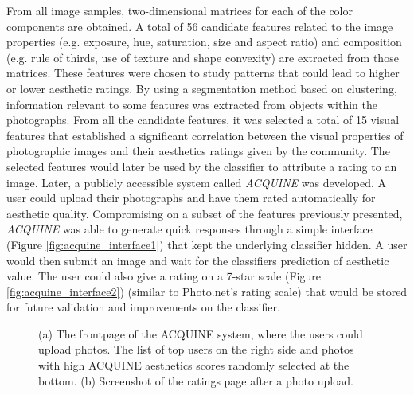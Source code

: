 From all image samples, two-dimensional matrices for each of the color components are obtained. A total of 56 candidate features related to the image properties (e.g. exposure, hue, saturation, size and aspect ratio) and composition (e.g. rule of thirds, use of texture and shape convexity) are extracted from those matrices. 
These features were chosen to study patterns that could lead to higher or lower aesthetic ratings. By using a segmentation method based on clustering, information relevant to some features was extracted from objects within the photographs.
From all the candidate features, it was selected a total of 15 visual features that established a significant correlation between the visual properties of photographic images and their aesthetics ratings given by the community. The selected features would later be used by the classifier to attribute a rating to an image.
Later, a publicly accessible system called \emph{ACQUINE} \cite{datta2010acquine} was developed. A user could upload their photographs and have them rated automatically for aesthetic quality. Compromising on a subset of the features previously presented, \emph{ACQUINE} was able to generate quick responses through a simple interface (Figure \ref{fig:acquine_interface1}) that kept the underlying classifier hidden. A user would then submit an image and wait for the classifiers prediction of aesthetic value. The user could also give a rating on a 7-star scale (Figure \ref{fig:acquine_interface2}) (similar to Photo.net's rating scale) that would be stored for future validation and improvements on the classifier.

\begin{figure}[htbp]
        \centering
  \caption{(a) The frontpage of the ACQUINE system, where the users could upload photos. The list of top users on the right side and photos with high ACQUINE aesthetics scores randomly selected at the bottom. (b) Screenshot of the ratings page after a photo upload. \cite{datta2010acquine}}
  \label{fig:acquine_image}
\end{figure}

